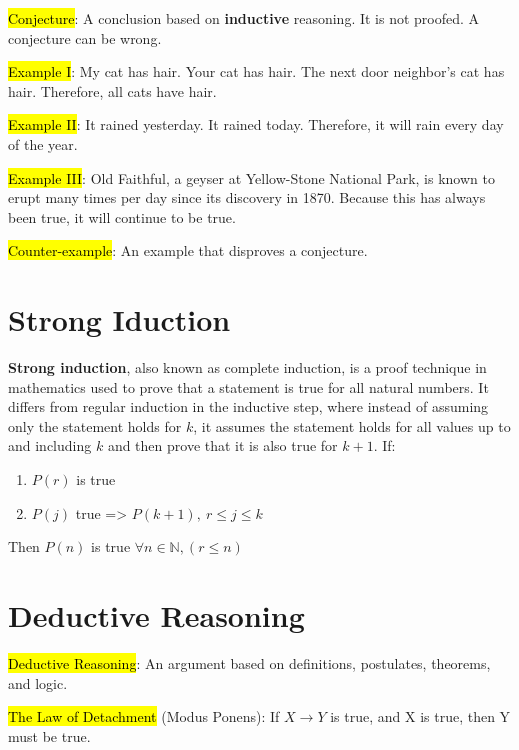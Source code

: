 \hl{Conjecture}: A conclusion based on \textbf{inductive} reasoning. It is not proofed. A conjecture can be wrong.

\vspace{.3cm}

\hl{Example I}: My cat has hair. Your cat has hair. The next door neighbor's cat has hair. Therefore, all cats have hair.

\hl{Example II}: It rained yesterday. It rained today. Therefore, it will rain every day of the year.

\hl{Example III}: Old Faithful, a geyser at Yellow-Stone National Park, is known to erupt many times per day since its discovery in 1870. Because this has always been true, it will continue to be true.

\vspace{0.3cm}

\hl{Counter-example}: An example that disproves a conjecture.

\section{Strong Iduction}

\textbf{Strong induction}, also known as complete induction, is a proof technique in mathematics used to prove that a statement is true for all natural numbers. It differs from regular induction in the inductive step, where instead of assuming only the statement holds for \(k\), it assumes the statement holds for all values up to and including $k$ and then prove that it is also true for $k+1$. If:

\begin{enumerate}
  \item $P(r)$ is true
  \item $P(j)$ true => $P(k+1),\ r\leq j \leq k$
\end{enumerate}

Then $P(n)$ is true $\forall n\in \mathbb{N}, (r \leq n)$

\section{Deductive Reasoning}

\hl{Deductive Reasoning}: An argument based on definitions, postulates, theorems, and logic.

\vspace{.4cm}

\hl{The Law of Detachment} (Modus Ponens): If $X \rightarrow Y$ is true, and X is true, then Y must be true.

